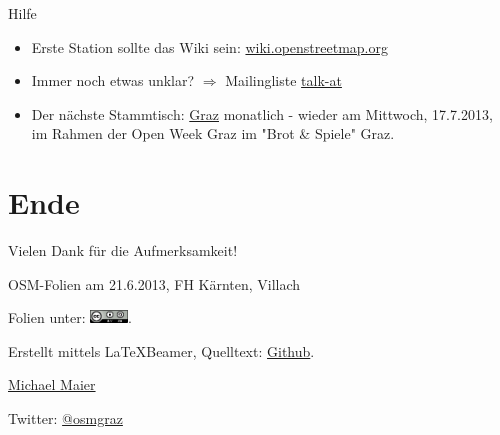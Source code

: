 \documentclass{beamer}
\begin{document}
\begin{frame}{Hilfe}

\begin{itemize}
  \item Erste Station sollte das Wiki sein: \href{http://wiki.openstreetmap.org}{wiki.openstreetmap.org}
  \item Immer noch etwas unklar? $\Rightarrow$ Mailingliste \href{http://lists.openstreetmap.org/listinfo/talk-at}{talk-at}
  \pause
  \item Der nächste Stammtisch: \href{http://wiki.openstreetmap.org/wiki/Graz/Stammtisch}{Graz} monatlich - wieder am Mittwoch, 17.7.2013, im Rahmen der Open Week Graz im "Brot \& Spiele" Graz.
\end{itemize}

\end{frame}

\section{Ende}

\begin{frame}{Vielen Dank für die Aufmerksamkeit!}

  OSM-Folien am 21.6.2013, FH Kärnten, Villach
\vspace{1cm}

Folien unter: \includegraphics[width=1cm]{cc-by-sa.png}.
\vspace{1cm}

Erstellt mittels \LaTeX Beamer, Quelltext: \href{https://github.com/species/vortrag-osm-fh\_ktn\_6-2013}{Github}.
\vspace{1cm}

\href{mailto:michael.maier@student.tugraz.at}{Michael Maier}

Twitter: \href{https://twitter.com/osmgraz}{@osmgraz}
\end{frame}
\end{document}
